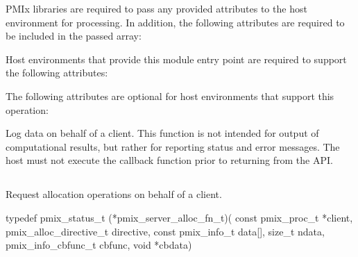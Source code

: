 \reqattrstart
\ac{PMIx} libraries are required to pass any provided attributes to the host environment for processing. In addition, the following attributes are required to be included in the passed  array:


\divider

Host environments that provide this module entry point are required to support the following attributes:


\reqattrend

\optattrstart
The following attributes are optional for host environments that support this operation:


\optattrend

\descr

Log data on behalf of a client. This function is not intended for output of computational results, but rather for reporting status and error messages. The host must not execute the callback function prior to returning from the \ac{API}.


\subsection{}

\summary

Request allocation operations on behalf of a client.

\format

\cspecificstart
\begin{codepar}
typedef pmix_status_t (*pmix_server_alloc_fn_t)(
                             const pmix_proc_t *client,
                             pmix_alloc_directive_t directive,
                             const pmix_info_t data[], size_t ndata,
                             pmix_info_cbfunc_t cbfunc, void *cbdata)
\end{codepar}
\cspecificend

\begin{arglist}
\end{arglist}

